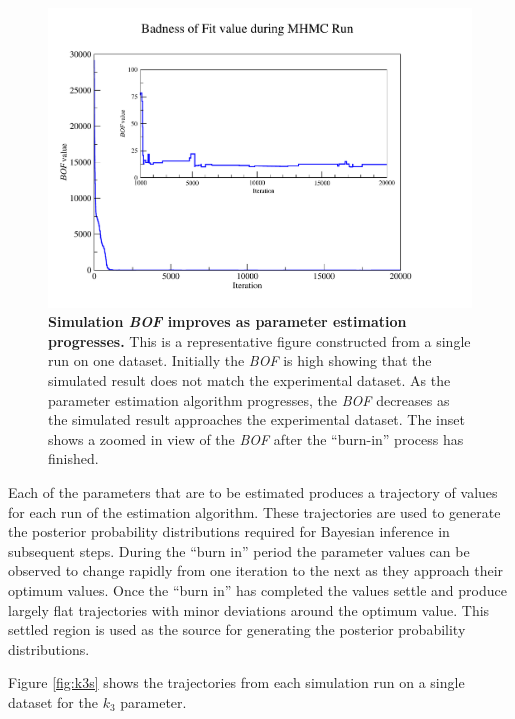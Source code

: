 \begin{figure}[p]
 \centering
 \includegraphics[width=14cm, trim=75px 50px 125px 25px]{./05-oxygenreduction/data/o2_fitness.pdf}
 \caption[Simulation \textit{BOF} improves as parameter estimation progresses]{{\bf Simulation \textit{BOF} improves as parameter estimation progresses.} This is a representative figure constructed from a single run on one dataset. Initially the \textit{BOF} is high showing that the simulated result does not match the experimental dataset. As the parameter estimation algorithm progresses, the \textit{BOF} decreases as the simulated result approaches the experimental dataset. The inset shows a zoomed in view of the \textit{BOF} after the ``burn-in'' process has finished.
 \label{fig:oxy_fitness}}
\end{figure}
\afterpage{\clearpage}

Each of the parameters that are to be estimated produces a trajectory of values for each run of the estimation algorithm. These trajectories are used to generate the posterior probability distributions required for Bayesian inference in subsequent steps. During the ``burn in'' period the parameter values can be observed to change rapidly from one iteration to the next as they approach their optimum values. Once the ``burn in'' has completed the values settle and produce largely flat trajectories with minor deviations around the optimum value. This settled region is used as the source for generating the posterior probability distributions.

Figure \ref{fig:k3s} shows the trajectories from each simulation run on a single dataset for the $k_3$ parameter.

